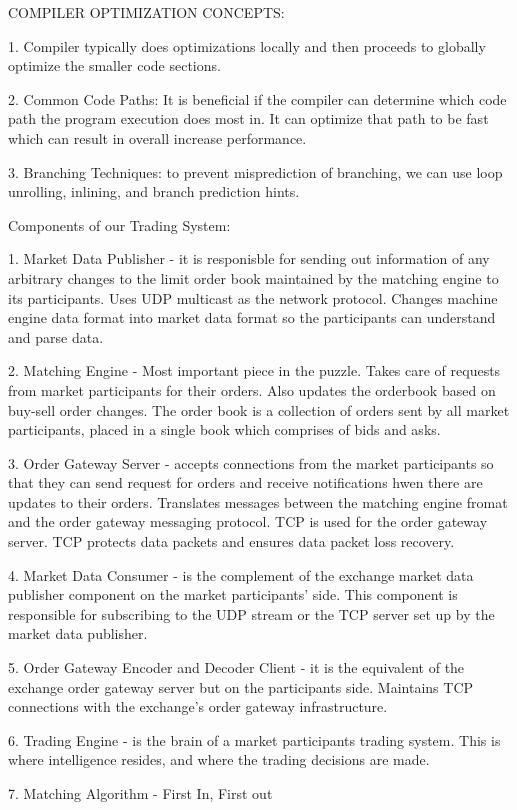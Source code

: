 COMPILER OPTIMIZATION CONCEPTS: 

1. Compiler typically does optimizations locally and then proceeds to globally optimize the smaller code sections. 

2. Common Code Paths: It is beneficial if the compiler can determine which code path the program execution does most in. It can optimize that path to be fast which can result in overall increase performance. 

3. Branching Techniques: to prevent misprediction of branching, we can use loop unrolling, inlining, and branch prediction hints. 

Components of our Trading System:

1. Market Data Publisher - it is responisble for sending out information of any arbitrary changes to the limit order book maintained by the matching engine to its participants.
Uses UDP multicast as the network protocol. Changes machine engine data format into market data format so the participants can understand and parse data.

2. Matching Engine - Most important piece in the puzzle. Takes care of requests from market participants for their orders. Also updates the orderbook based on buy-sell 
order changes. The order book is a collection of orders sent by all market participants, placed in a single book which comprises of bids and asks.

3. Order Gateway Server - accepts connections from the market participants so that they can send request for orders and receive notifications hwen there are
updates to their orders. Translates messages between the matching engine fromat and the order gateway messaging protocol. TCP is used for the order gateway server.
TCP protects data packets and ensures data packet loss recovery.

4. Market Data Consumer - is the complement of the exchange market data publisher component on the market participants' side. This component is responsible for subscribing
to the UDP stream or the TCP server set up by the market data publisher.

5. Order Gateway Encoder and Decoder Client - it is the equivalent of the exchange order gateway server but on the participants side. Maintains TCP connections with the
exchange's order gateway infrastructure.

6. Trading Engine - is the brain of a market participants trading system. This is where intelligence resides, and where the trading decisions are made.

7. Matching Algorithm - First In, First out



